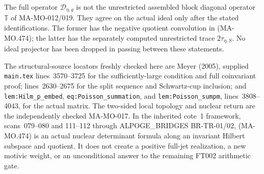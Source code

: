 The full operator \(\mathscr D_{\eta,g}\) is not the
unrestricted assembled block diagonal operator
\(\mathbb T\) of MA-MO-012/019. They agree on the actual
ideal only after the stated identifications. The former has
the negative quotient convolution in (MA-MO.474); the latter
has the separately computed unrestricted trace
\(2\tau_{\eta,S}\). No ideal projector has been dropped
in passing between these statements.

The structural-source locators freshly checked here are
Meyer (2005), supplied \texttt{main.tex} lines~3570--3725
for the sufficiently-large condition and full coinvariant
proof; lines~2630--2675 for the split sequence and
Schwartz-cup inclusion; and \texttt{lem:Hilm\_p\_embed},
\texttt{eq:Poisson\_summation}, and
\texttt{lem:Poisson\_sumpm}, lines~3808--4043, for the
actual matrix. The two-sided local topology and nuclear
return are the independently checked MA-MO-017.
In the inherited cote~1 framework, scans~079--080 and
111--112 through ALPOGE\_BRIDGES BR-TR-01/02, (MA-MO.474)
is an actual nuclear determinant formula along an invariant
Hilbert subspace and quotient. It does not create a positive
full-jet realization, a new motivic weight, or an unconditional
answer to the remaining FT002 arithmetic gate.
